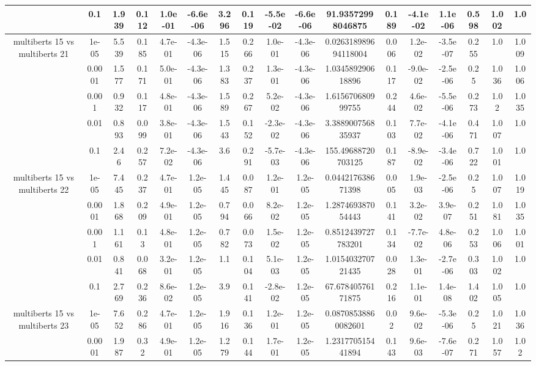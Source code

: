 \begin{tabular}{|c|c|c|c|c|c|c|c|c|c|c|c|c|c|c|c|c|}
 & 0.1 & 1.939 & 0.112 & 1.0e-01 & -6.6e-06 & 3.296 & 0.119 & -5.5e-02 & -6.6e-06 & 91.93572998046875 & 0.189 & -4.1e-02 & 1.1e-06 & 0.598 & 1.002 & 1.0 \\
\hline
\multirow{5}{*}{multiberts 15 vs multiberts 21} & 1e-05 & 5.539 & 0.185 & 4.7e-01 & -4.3e-06 & 1.515 & 0.266 & 1.0e-01 & -4.3e-06 & 0.026318989694118004 & 0.006 & 1.2e-02 & -3.5e-07 & 0.255 & 1.0 & 1.009 \\
 & 0.0001 & 1.577 & 0.171 & 5.0e-01 & -4.3e-06 & 1.383 & 0.237 & 1.3e-01 & -4.3e-06 & 1.034589290618896 & 0.117 & -9.0e-02 & -2.5e-06 & 0.25 & 1.036 & 1.006 \\
 & 0.001 & 0.932 & 0.117 & 4.8e-01 & -4.3e-06 & 1.589 & 0.267 & 5.2e-02 & -4.3e-06 & 1.615670680999755 & 0.244 & 4.6e-02 & -5.5e-06 & 0.273 & 1.02 & 1.035 \\
 & 0.01 & 0.893 & 0.099 & 3.8e-01 & -4.3e-06 & 1.543 & 0.152 & -2.3e-02 & -4.3e-06 & 3.388900756835937 & 0.103 & 7.7e-02 & -4.1e-06 & 0.471 & 1.007 & 1.0 \\
 & 0.1 & 2.46 & 0.257 & 7.2e-02 & -4.3e-06 & 3.6 & 0.291 & -5.7e-03 & -4.3e-06 & 155.49688720703125 & 0.187 & -8.9e-02 & -3.4e-06 & 0.722 & 1.001 & 1.0 \\
\hline
\multirow{5}{*}{multiberts 15 vs multiberts 22} & 1e-05 & 7.445 & 0.237 & 4.7e-01 & 1.2e-05 & 1.445 & 0.087 & 1.2e-01 & 1.2e-05 & 0.044217638671398 & 0.005 & 1.9e-03 & -2.5e-06 & 0.25 & 1.007 & 1.019 \\
 & 0.0001 & 1.868 & 0.209 & 4.9e-01 & 1.2e-05 & 0.794 & 0.066 & 8.2e-02 & 1.2e-05 & 1.287469387054443 & 0.141 & 3.2e-02 & 3.9e-07 & 0.251 & 1.081 & 1.035 \\
 & 0.001 & 1.161 & 0.13 & 4.8e-01 & 1.2e-05 & 0.782 & 0.073 & 1.5e-02 & 1.2e-05 & 0.8512439727783201 & 0.134 & -7.7e-02 & 4.8e-06 & 0.253 & 1.006 & 1.001 \\
 & 0.01 & 0.841 & 0.068 & 3.2e-01 & 1.2e-05 & 1.1 & 0.104 & 5.1e-03 & 1.2e-05 & 1.015403270721435 & 0.028 & 1.3e-01 & -2.7e-06 & 0.303 & 1.002 & 1.0 \\
 & 0.1 & 2.769 & 0.236 & 8.6e-02 & 1.2e-05 & 3.9 & 0.141 & -2.8e-02 & 1.2e-05 & 67.67840576171875 & 0.216 & 1.1e-01 & 1.4e-08 & 1.402 & 1.005 & 1.0 \\
\hline
\multirow{5}{*}{multiberts 15 vs multiberts 23} & 1e-05 & 7.652 & 0.286 & 4.7e-01 & 1.2e-05 & 1.916 & 0.136 & 1.2e-01 & 1.2e-05 & 0.08708538860082601 & 0.02 & 9.6e-02 & -5.3e-06 & 0.25 & 1.021 & 1.036 \\
 & 0.0001 & 1.987 & 0.32 & 4.9e-01 & 1.2e-05 & 1.279 & 0.144 & 1.7e-01 & 1.2e-05 & 1.231770515441894 & 0.143 & 9.6e-03 & -7.6e-07 & 0.271 & 1.057 & 1.02 \\

\end{tabular}
